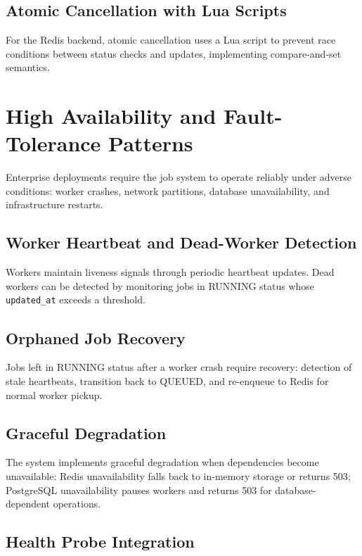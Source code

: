\documentclass[a4paper,twoside]{sapthesis}
\begin{document}
\subsection{Atomic Cancellation with Lua Scripts}

For the Redis backend, atomic cancellation uses a Lua script to prevent race conditions between status checks and updates, implementing compare-and-set semantics.

\section{High Availability and Fault-Tolerance Patterns}
\label{sec:ha-ft}

Enterprise deployments require the job system to operate reliably under adverse conditions: worker crashes, network partitions, database unavailability, and infrastructure restarts.

\subsection{Worker Heartbeat and Dead-Worker Detection}

Workers maintain liveness signals through periodic heartbeat updates. Dead workers can be detected by monitoring jobs in RUNNING status whose \texttt{updated\_at} exceeds a threshold.

\subsection{Orphaned Job Recovery}

Jobs left in RUNNING status after a worker crash require recovery: detection of stale heartbeats, transition back to QUEUED, and re-enqueue to Redis for normal worker pickup.

\subsection{Graceful Degradation}

The system implements graceful degradation when dependencies become unavailable: Redis unavailability falls back to in-memory storage or returns 503; PostgreSQL unavailability pauses workers and returns 503 for database-dependent operations.

\subsection{Health Probe Integration}
\end{document}
